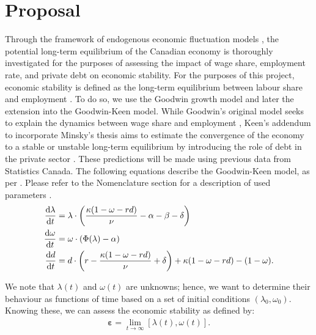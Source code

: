 \documentclass[12pt, centerh1]{article}
\begin{document}
\section{Proposal} \label{s:proposal}
Through the framework of endogenous economic fluctuation models \citep{boldrin1990equilibrium}, the potential long-term equilibrium of the Canadian economy is thoroughly investigated for the purposes of assessing the impact of wage share, employment rate, and private debt on economic stability. For the purposes of this project, economic stability is defined as the long-term equilibrium between labour share and employment \citep{weitzman1983some}. To do so, we use the Goodwin growth model and later the extension into the Goodwin-Keen model. While Goodwin’s original model seeks to explain the dynamics between wage share and employment \citep{goodwin1982growth}, Keen’s addendum to incorporate Minsky’s thesis aims to estimate the convergence of the economy to a stable or unstable long-term equilibrium by introducing the role of debt in the private sector \citep{keen1995finance}. These predictions will be made using previous data from Statistics Canada. The following equations describe the Goodwin-Keen model, as per \citet{grasselli2012analysis}. Please refer to the Nomenclature section for a description of used parameters \citep{grasselli2012analysis,maheshwari2015empirical}.
\begin{align*} 
\centering
    \dv{\lambda}{t} &= \lambda \cdot \left( \frac{\kappa(1-\omega-rd)}{\nu} - \alpha - \beta - \delta \right)\\ 
    \dv{\omega}{t} &= \omega \cdot (\Phi(\lambda) - \alpha)\\
    \dv{d}{t} &= d\cdot\left(r-\frac{\kappa(1-\omega-rd)}{\nu}+\delta\right)+\kappa(1-\omega-rd)-(1-\omega). 
\end{align*}

\noindent We note that $\lambda(t)$ and $\omega(t)$ are unknowns; hence, we want to determine their behaviour as functions of time based on a set of initial conditions $(\lambda_0,\omega_0)$. Knowing these, we can assess the economic stability as defined by:
\begin{equation*}
    \begin{split}
        \bm{\varepsilon}=\lim_{t\to\infty}[\lambda(t), \omega(t)].
    \end{split}
\end{equation*}
\end{document}
